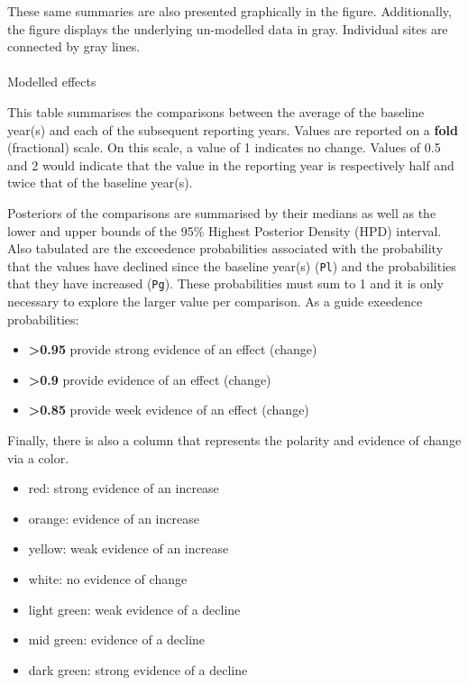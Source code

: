 \documentclass[
  8pt,
  a4paper]{article}
\makeatletter
\let\oldparagraph\paragraph
\renewcommand{\paragraph}{
    \@ifstar
      \xxxParagraphStar
      \xxxParagraphNoStar
  }
\newcommand{\xxxParagraphStar}[1]{\oldparagraph*{#1}\mbox{}}
\newcommand{\xxxParagraphNoStar}[1]{\oldparagraph{#1}\mbox{}}
\providecommand{\tightlist}{%
  \setlength{\itemsep}{0pt}\setlength{\parskip}{0pt}}\usepackage{longtable,booktabs,array}
\makeatother
\begin{document}
These same summaries are also presented graphically in the figure.
Additionally, the figure displays the underlying un-modelled data in
gray. Individual sites are connected by gray lines.

\paragraph{Modelled effects}\label{modelled-effects}

This table summarises the comparisons between the average of the
baseline year(s) and each of the subsequent reporting years. Values are
reported on a \textbf{fold} (fractional) scale. On this scale, a value
of 1 indicates no change. Values of 0.5 and 2 would indicate that the
value in the reporting year is respectively half and twice that of the
baseline year(s).

Posteriors of the comparisons are summarised by their medians as well as
the lower and upper bounds of the 95\% Highest Posterior Density (HPD)
interval. Also tabulated are the exceedence probabilities associated
with the probability that the values have declined since the baseline
year(s) (\texttt{Pl}) and the probabilities that they have increased
(\texttt{Pg}). These probabilities must sum to 1 and it is only
necessary to explore the larger value per comparison. As a guide
exeedence probabilities:

\begin{itemize}
\tightlist
\item
  \textbf{\textgreater0.95} provide strong evidence of an effect
  (change)
\item
  \textbf{\textgreater0.9} provide evidence of an effect (change)
\item
  \textbf{\textgreater0.85} provide week evidence of an effect (change)
\end{itemize}

Finally, there is also a column that represents the polarity and
evidence of change via a color.

\begin{itemize}
\tightlist
\item
  red: strong evidence of an increase
\item
  orange: evidence of an increase
\item
  yellow: weak evidence of an increase
\item
  white: no evidence of change
\item
  light green: weak evidence of a decline
\item
  mid green: evidence of a decline
\item
  dark green: strong evidence of a decline
\end{itemize}
\end{document}
